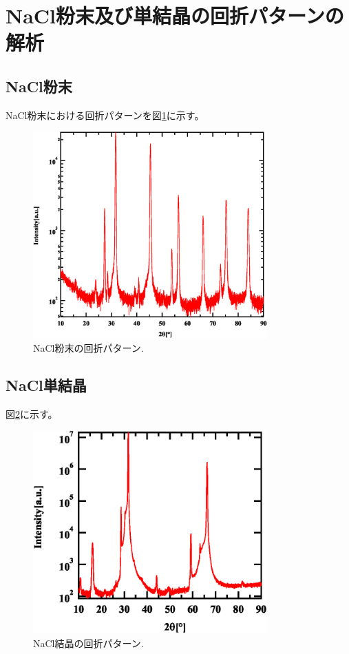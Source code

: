 \documentclass[11pt,a4j,uplatex]{jsarticle}
\begin{document}
\newpage
\section{NaCl粉末及び単結晶の回折パターンの解析}


\subsection{NaCl粉末}

NaCl粉末における回折パターンを図\ref{powder}に示す。

\begin{figure}[htb]
 \centering
 \includegraphics[clip,width=9cm]{FigPowder.eps}
 \caption{NaCl粉末の回折パターン.}
 \label{powder}
\end{figure}



\subsection{NaCl単結晶}

図\ref{bulk}に示す。

\begin{figure}[htb]
 \centering
 \includegraphics[clip,width=9cm]{FigBulk.eps}
 \caption{NaCl結晶の回折パターン.}
 \label{bulk}
\end{figure}
\end{document}
